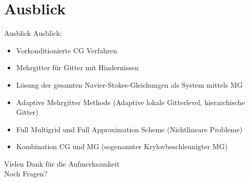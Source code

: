 \documentclass[aspectratio=169]{beamer}
\theoremstyle{thm}
\begin{document}
\section{Ausblick}\label{sec:Ausblick}
\begin{frame}{Ausblick}
  Ausblick:
  \begin{itemize}[<+(1)->]
    \item Vorkonditionierte CG Verfahren
    \item Mehrgitter für Gitter mit Hindernissen
    \item Lösung der gesamten Navier-Stokes-Gleichungen als System mittels MG
    \item Adaptive Mehrgitter Methode (Adaptive lokale Gitterlevel,
        hierarchische Gitter)
    \item Full Multigrid und Full Approximation Scheme (Nichtlineare Probleme)
    \item Kombination CG und MG (sogenannter Krylovbeschleunigter MG)
  \end{itemize}
\end{frame}

\begin{frame}[plain]
  \begin{center}
    \Large \textcolor{simtechred}{ Vielen Dank für die Aufmerksamkeit } \\[2em]
    \normalsize Noch Fragen?
  \end{center}
\end{frame}
\end{document}
